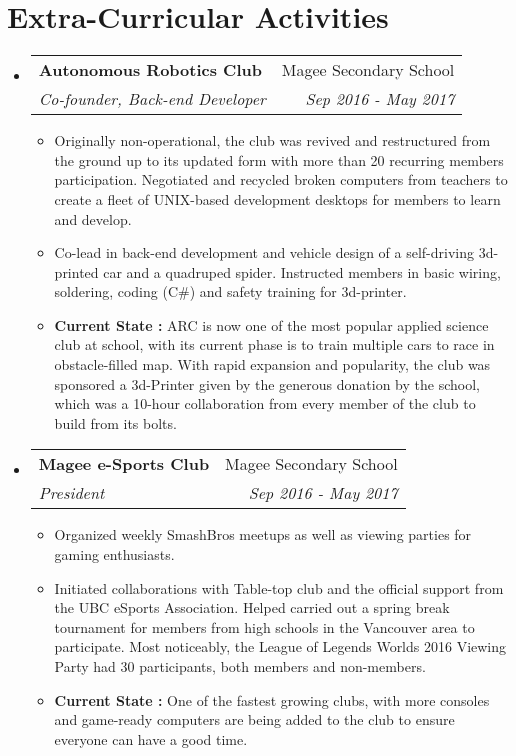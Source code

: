 \documentclass[letterpaper,10.8pt]{article}
\makeatletter
\newcommand{\resumeItem}[2]{
  \item\small{
    \textbf{#1}{#2 \vspace{-2pt}}
  }
}
\newcommand{\resumeSubheading}[4]{
  \vspace{-1pt}\item
    \begin{tabular*}{0.97\textwidth}{l@{\extracolsep{\fill}}r}
      \textbf{#1} & #2 \\
      \textit{\small#3} & \textit{\small #4} \\
    \end{tabular*}\vspace{-5pt}
}
\newcommand{\resumeSubHeadingListStart}{\begin{itemize}[leftmargin=*]}
\newcommand{\resumeSubHeadingListEnd}{\end{itemize}}
\newcommand{\resumeItemListStart}{\begin{itemize}}
\newcommand{\resumeItemListEnd}{\end{itemize}\vspace{0pt}}
\makeatother
\begin{document}
\section{Extra-Curricular Activities}
  \resumeSubHeadingListStart
    \resumeSubheading
      {Autonomous Robotics Club}{Magee Secondary School}
      {Co-founder, Back-end Developer}{Sep 2016 - May 2017}
      \resumeItemListStart
        \resumeItem{}
            {Originally non-operational, the club was revived and restructured from the ground up to its updated form with more than 20 recurring members participation. Negotiated and recycled broken computers from teachers to create a fleet of UNIX-based development desktops for members to learn and develop. }
        \resumeItem{}
            {Co-lead in back-end development and vehicle design of a self-driving 3d-printed car and a quadruped spider. Instructed members in basic wiring, soldering, coding (C\#) and safety training for 3d-printer.}
        \resumeItem{Current State : }
            {ARC is now one of the most popular applied science club at school, with its current phase is to train multiple cars to race in obstacle-filled map. With rapid expansion and popularity, the club was sponsored a 3d-Printer given by the generous donation by the school, which was a 10-hour collaboration from every member of the club to build from its bolts.}
      \resumeItemListEnd

    \resumeSubheading
      {Magee e-Sports Club}{Magee Secondary School}
      {President}{Sep 2016 - May 2017}
      \resumeItemListStart
        \resumeItem{}
            {Organized weekly SmashBros meetups as well as viewing parties for gaming enthusiasts.}
        \resumeItem{}
            {Initiated collaborations with Table-top club and the official support from the UBC eSports Association. Helped carried out a spring break tournament for members from high schools in the Vancouver area to participate. Most noticeably, the League of Legends Worlds 2016 Viewing Party had 30 participants, both members and non-members.}
        \resumeItem{Current State : }
            {One of the fastest growing clubs, with more consoles and game-ready computers are being added to the club to ensure everyone can have a good time.}
      \resumeItemListEnd
    \resumeSubHeadingListEnd

\end{document}
